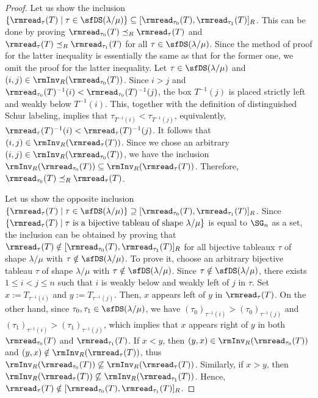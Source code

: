 \documentclass[12pt, reqno]{amsart}
\theoremstyle{definition}
\numberwithin{equation}{section} \numberwithin{figure}{section}
\numberwithin{table}{section}
\begin{document}
\begin{proof}
Let us show the inclusion $\{\rmread_\tau(T) \mid \tau \in \sfDS(\lambda/\mu)\} \subseteq [\rmread_{\tau_0}(T), \rmread_{\tau_1}(T)]_R$.
This can be done by proving $\rmread_{\tau_0}(T) \preceq_R \rmread_{\tau}(T)$ and $\rmread_{\tau}(T) \preceq_R \rmread_{\tau_1}(T)$ for all $\tau \in \sfDS(\lambda/\mu)$.
Since the method of proof for the latter inequality is essentially the same as that for the former one, we omit the proof for the latter inequality.
Let $\tau \in \sfDS(\lambda/\mu)$ and
$(i,j) \in \rmInv_R(\rmread_{\tau_0}(T))$.
Since $i > j$ and $\rmread_{\tau_0}(T)^{-1}(i) < \rmread_{\tau_0}(T)^{-1}(j)$,
the box $T^{-1}(j)$ is placed strictly left and weakly below $T^{-1}(i)$.
This, together with the definition of distinguished Schur labeling, implies that $\tau_{T^{-1}(i)} < \tau_{T^{-1}(j)}$, equivalently, $\rmread_{\tau}(T)^{-1}(i) < \rmread_{\tau}(T)^{-1}(j)$.
It follows that $(i,j) \in \rmInv_R(\rmread_{\tau}(T))$.
Since we chose an arbitrary $(i,j) \in \rmInv_R(\rmread_{\tau_0}(T))$, we have the inclusion $\rmInv_R(\rmread_{\tau_0}(T)) \subseteq \rmInv_R(\rmread_{\tau}(T))$.
Therefore, $\rmread_{\tau_0}(T) \preceq_R \rmread_{\tau}(T)$.

Let us show the opposite inclusion $\{\rmread_\tau(T) \mid \tau \in \sfDS(\lambda/\mu)\} \supseteq [\rmread_{\tau_0}(T), \rmread_{\tau_1}(T)]_R$.
Since $\{\rmread_\tau(T) \mid \text{$\tau$ is a bijective tableau of shape $\lambda / \mu$} \}$ is equal to $\SG_n$ as a set,
the inclusion can be obtained by proving that $\rmread_\tau(T) \notin [\rmread_{\tau_0}(T), \rmread_{\tau_1}(T)]_R$ for all bijective tableaux $\tau$ of shape $\lambda/\mu$ with $\tau \notin \sfDS(\lambda/\mu)$.
To prove it, choose an arbitrary bijective tableau $\tau$ of shape $\lambda/\mu$ with $\tau \notin \sfDS(\lambda/\mu)$.
Since $\tau \notin \sfDS(\lambda/\mu)$, there exists $ 1 \leq i < j \leq n$ such that $i$ is weakly below and weakly left of $j$ in $\tau$.
Set $x := T_{\tau^{-1}(i)}$ and $y := T_{\tau^{-1}(j)}$.
Then, $x$ appears left of $y$ in $\rmread_\tau(T)$.
On the other hand, since $\tau_0, \tau_1 \in \sfDS(\lambda/\mu)$, 
we have $(\tau_0)_{\tau^{-1}(i)} > (\tau_0)_{\tau^{-1}(j)}$ and $(\tau_1)_{\tau^{-1}(i)} > (\tau_1)_{\tau^{-1}(j)}$, which implies that $x$ appears right of $y$ in both $\rmread_{\tau_0}(T)$ and $\rmread_{\tau_1}(T)$.
If $x < y$, then $(y, x) \in \rmInv_R(\rmread_{\tau_0}(T))$ and $(y, x) \notin \rmInv_R(\rmread_\tau(T))$, thus $\rmInv_R(\rmread_{\tau_0}(T)) \not\subseteq \rmInv_R(\rmread_{\tau}(T))$.
Similarly, if $x > y$, then 
$\rmInv_R(\rmread_\tau(T)) \not\subseteq \rmInv_R(\rmread_{\tau_1}(T))$.
Hence, $\rmread_\tau(T) \notin [\rmread_{\tau_0}(T), \rmread_{\tau_1}(T)]_R$.
\end{proof}
\end{document}
